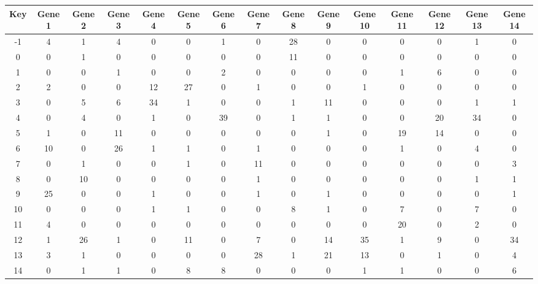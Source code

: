\begin{tabular}{|c|c|c|c|c|c|c|c|c|c|c|c|c|c|c|}
\hline
Key & Gene 1 & Gene 2 & Gene 3 & Gene 4 & Gene 5 & Gene 6 & Gene 7 & Gene 8 & Gene 9 & Gene 10 & Gene 11 & Gene 12 & Gene 13 & Gene 14 \\
\hline
-1 & 4 & 1 & 4 & 0 & 0 & 1 & 0 & 28 & 0 & 0 & 0 & 0 & 1 & 0 \\
0 & 0 & 1 & 0 & 0 & 0 & 0 & 0 & 11 & 0 & 0 & 0 & 0 & 0 & 0 \\
1 & 0 & 0 & 1 & 0 & 0 & 2 & 0 & 0 & 0 & 0 & 1 & 6 & 0 & 0 \\
2 & 2 & 0 & 0 & 12 & 27 & 0 & 1 & 0 & 0 & 1 & 0 & 0 & 0 & 0 \\
3 & 0 & 5 & 6 & 34 & 1 & 0 & 0 & 1 & 11 & 0 & 0 & 0 & 1 & 1 \\
4 & 0 & 4 & 0 & 1 & 0 & 39 & 0 & 1 & 1 & 0 & 0 & 20 & 34 & 0 \\
5 & 1 & 0 & 11 & 0 & 0 & 0 & 0 & 0 & 1 & 0 & 19 & 14 & 0 & 0 \\
6 & 10 & 0 & 26 & 1 & 1 & 0 & 1 & 0 & 0 & 0 & 1 & 0 & 4 & 0 \\
7 & 0 & 1 & 0 & 0 & 1 & 0 & 11 & 0 & 0 & 0 & 0 & 0 & 0 & 3 \\
8 & 0 & 10 & 0 & 0 & 0 & 0 & 1 & 0 & 0 & 0 & 0 & 0 & 1 & 1 \\
9 & 25 & 0 & 0 & 1 & 0 & 0 & 1 & 0 & 1 & 0 & 0 & 0 & 0 & 1 \\
10 & 0 & 0 & 0 & 1 & 1 & 0 & 0 & 8 & 1 & 0 & 7 & 0 & 7 & 0 \\
11 & 4 & 0 & 0 & 0 & 0 & 0 & 0 & 0 & 0 & 0 & 20 & 0 & 2 & 0 \\
12 & 1 & 26 & 1 & 0 & 11 & 0 & 7 & 0 & 14 & 35 & 1 & 9 & 0 & 34 \\
13 & 3 & 1 & 0 & 0 & 0 & 0 & 28 & 1 & 21 & 13 & 0 & 1 & 0 & 4 \\
14 & 0 & 1 & 1 & 0 & 8 & 8 & 0 & 0 & 0 & 1 & 1 & 0 & 0 & 6 \\
\hline
\end{tabular}